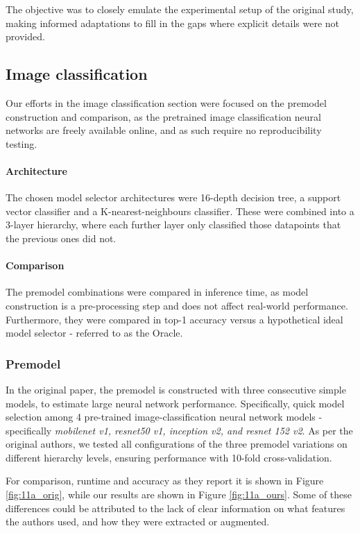 The objective was to closely emulate the experimental setup of the original study, making informed adaptations to fill in the gaps where explicit details were not provided.

\subsection{Image classification}

Our efforts in the image classification section were focused on the premodel construction and comparison, as the pretrained image classification neural networks are freely available online, and as such require no reproducibility testing.
\paragraph{Architecture}
The chosen model selector architectures were 16-depth decision tree, a support vector classifier and a K-nearest-neighbours classifier. These were combined into a 3-layer hierarchy, where each further layer only classified those datapoints that the previous ones did not.
\paragraph{Comparison}
The premodel combinations were compared in inference time, as model construction is a pre-processing step and does not affect real-world performance. Furthermore, they were compared in top-1 accuracy versus a hypothetical ideal model selector - referred to as the Oracle.


\subsubsection{Premodel}
In the original paper, the premodel is constructed with three consecutive simple models, to estimate large neural network performance. Specifically, quick model selection among 4 pre-trained image-classification neural network models - specifically \textit{mobilenet v1, resnet50 v1, inception v2, and resnet 152 v2}. As per the original authors, we tested all configurations of the three premodel variations on different hierarchy levels, ensuring performance with 10-fold cross-validation.

For comparison, runtime and accuracy as they report it is shown in Figure \ref{fig:11a_orig}, while our results are shown in Figure \ref{fig:11a_ours}. Some of these differences could be attributed to the lack of clear information on what features the authors used, and how they were extracted or augmented.

